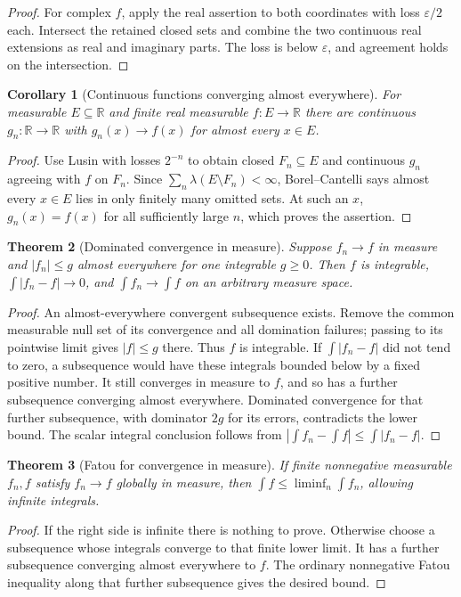 \documentclass[11pt,oneside,openany]{book}
\newtheorem{theorem}{Theorem}[chapter]
\newtheorem{corollary}[theorem]{Corollary}
\theoremstyle{definition}
\theoremstyle{remark}
\newcommand{\R}{\mathbb R}\newcommand{\C}{\mathbb C}
\newcommand{\eps}{\varepsilon}\newcommand{\ee}{\varepsilon}
\newcommand{\family}[1]{}
\begin{document}
\begin{proof}
For complex $f$, apply the real assertion to both coordinates with loss
$\eps/2$ each. Intersect the retained closed sets and combine the two
continuous real extensions as real and imaginary parts. The loss is below
$\eps$, and agreement holds on the intersection.
\end{proof}

\begin{corollary}[Continuous functions converging almost everywhere]
\family{D11.07.continuous_ae_sequence}\label{d11:07:continuous-ae-sequence}
For measurable $E\subseteq\R$ and finite real measurable $f:E\to\R$
there are continuous $g_n:\R\to\R$ with $g_n(x)\to f(x)$ for almost
every $x\in E$.
\end{corollary}
\begin{proof}
Use Lusin with losses $2^{-n}$ to obtain closed $F_n\subseteq E$ and
continuous $g_n$ agreeing with $f$ on $F_n$. Since
$\sum_n\lambda(E\setminus F_n)<\infty$, Borel--Cantelli says almost
every $x\in E$ lies in only finitely many omitted sets. At such an $x$,
$g_n(x)=f(x)$ for all sufficiently large $n$, which proves the assertion.
\end{proof}

\begin{theorem}[Dominated convergence in measure]
\family{D11.07.dominated_measure_lone}\label{d11:07:dominated-measure-lone}
Suppose $f_n\to f$ in measure and $|f_n|\leq g$ almost everywhere for
one integrable $g\geq0$. Then $f$ is integrable,
$\int|f_n-f|\to0$, and $\int f_n\to\int f$ on an arbitrary measure space.
\end{theorem}
\begin{proof}
An almost-everywhere convergent subsequence exists. Remove the common
measurable null set of its convergence and all domination failures;
passing to its pointwise limit gives $|f|\leq g$ there. Thus $f$ is
integrable. If $\int|f_n-f|$ did not tend to zero, a subsequence would
have these integrals bounded below by a fixed positive number. It still
converges in measure to $f$, and so has a further subsequence converging
almost everywhere. Dominated convergence for that further subsequence,
with dominator $2g$ for its errors, contradicts the lower bound.
The scalar integral conclusion follows from
$|\int f_n-\int f|\leq\int|f_n-f|$.
\end{proof}

\begin{theorem}[Fatou for convergence in measure]
\family{D11.07.fatou_measure}\label{d11:07:fatou-measure}
If finite nonnegative measurable $f_n,f$ satisfy $f_n\to f$ globally in
measure, then $\int f\leq\liminf_n\int f_n$, allowing infinite integrals.
\end{theorem}
\begin{proof}
If the right side is infinite there is nothing to prove. Otherwise choose
a subsequence whose integrals converge to that finite lower limit.
It has a further subsequence converging almost everywhere to $f$.
The ordinary nonnegative Fatou inequality along that further subsequence
gives the desired bound.
\end{proof}
\end{document}
